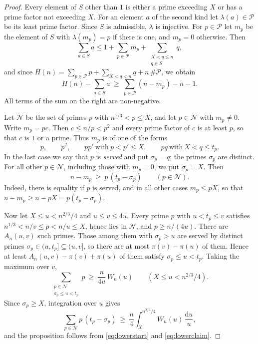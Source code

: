 \documentclass[11pt,reqno]{amsart}
\theoremstyle{definition}
\theoremstyle{remark}
\numberwithin{equation}{section}
\newcommand{\dd}{\mathrm{d}}
\newcommand{\cP}{\mathcal{P}}
\newcommand{\cN}{\mathcal{N}}
\begin{document}
\begin{proof}
Every element of $S$ other than $1$ is either a prime exceeding $X$ or has a prime factor not exceeding $X$. For an element $a$ of the second kind let $\lambda(a)\in\cP$ be its least prime factor. Since $S$ is admissible, $\lambda$ is injective. For $p\in\cP$ let $m_p$ be the element of $S$ with $\lambda(m_p)=p$ if there is one, and $m_p=0$ otherwise. Then
\[
 \sum_{a\in S}a\le1+\sum_{p\in\cP}m_p+\sum_{\substack{X<q\le n\\ q\in S}}q,
\]
and since $H(n)=\sum_{p\in\cP}p+\sum_{X<q<n}q+n\,\#\cP$, we obtain
\begin{equation}\label{eq:lowerstart}
 H(n)-\sum_{a\in S}a\ \ge\ \sum_{p\in\cP}(n-m_p)-n-1 .
\end{equation}
All terms of the sum on the right are non-negative.

Let $\cN$ be the set of primes $p$ with $n^{1/3}<p\le X$, and let $p\in\cN$ with $m_p\ne0$. Write $m_p=pc$. Then $c\le n/p<p^2$ and every prime factor of $c$ is at least $p$, so that $c$ is $1$ or a prime. Thus $m_p$ is of one of the forms
\[
 p,\qquad p^2,\qquad pp'\ \text{with}\ p<p'\le X,\qquad pq\ \text{with}\ X<q\le t_p .
\]
In the last case we say that $p$ is \emph{served} and put $\sigma_p=q$; the primes $\sigma_p$ are distinct. For all other $p\in\cN$, including those with $m_p=0$, we put $\sigma_p=X$. Then
\begin{equation}\label{eq:lowerclaim}
 n-m_p\ \ge\ p\,(t_p-\sigma_p)\qquad(p\in\cN).
\end{equation}
Indeed, there is equality if $p$ is served, and in all other cases $m_p\le pX$, so that $n-m_p\ge n-pX=p(t_p-\sigma_p)$.

Now let $X\le u<n^{2/3}/4$ and $u\le v\le4u$. Every prime $p$ with $u<t_p\le v$ satisfies $n^{1/3}<n/v\le p<n/u\le X$, hence lies in $\cN$, and $p\ge n/(4u)$. There are $A_n(u,v)$ such primes. Those among them with $\sigma_p>u$ are served by distinct primes $\sigma_p\in(u,t_p]\subseteq(u,v]$, so there are at most $\pi(v)-\pi(u)$ of them. Hence at least $A_n(u,v)-\pi(v)+\pi(u)$ of them satisfy $\sigma_p\le u<t_p$. Taking the maximum over $v$,
\[
 \sum_{\substack{p\in\cN\\ \sigma_p\le u<t_p}}p\ \ge\ \frac{n}{4u}\,W_n(u)\qquad(X\le u<n^{2/3}/4).
\]
Since $\sigma_p\ge X$, integration over $u$ gives
\[
 \sum_{p\in\cN}p\,(t_p-\sigma_p)\ \ge\ \frac n4\int_X^{n^{2/3}/4}W_n(u)\,\frac{\dd u}{u},
\]
and the proposition follows from \eqref{eq:lowerstart} and \eqref{eq:lowerclaim}.
\end{proof}
\end{document}

